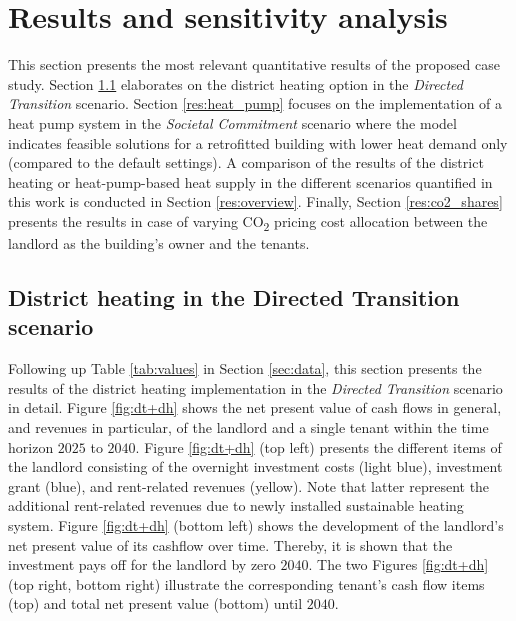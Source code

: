 \section{Results and sensitivity analysis}\label{results}
This section presents the most relevant quantitative results of the proposed case study. Section \ref{res:district_heating} elaborates on the district heating option in the \textit{Directed Transition} scenario. Section \ref{res:heat_pump} focuses on the implementation of a heat pump system in the \textit{Societal Commitment} scenario where the model indicates feasible solutions for a retrofitted building with lower heat demand only (compared to the default settings). A comparison of the results of the district heating or heat-pump-based heat supply in the different scenarios quantified in this work is conducted in Section \ref{res:overview}. Finally, Section \ref{res:co2_shares} presents the results in case of varying CO\textsubscript{2} pricing cost allocation between the landlord as the building's owner and the tenants. 

\subsection{District heating in the Directed Transition scenario}\label{res:district_heating}
Following up Table \ref{tab:values} in Section \ref{sec:data}, this section presents the results of the district heating implementation in the \textit{Directed Transition} scenario in detail. Figure \ref{fig:dt+dh} shows the net present value of cash flows in general, and revenues in particular, of the landlord and a single tenant within the time horizon $2025$ to $2040$. Figure \ref{fig:dt+dh} (top left) presents the different items of the landlord consisting of the overnight investment costs (light blue), investment grant (blue), and rent-related revenues (yellow). Note that latter represent the additional rent-related revenues due to newly installed sustainable heating system. Figure \ref{fig:dt+dh} (bottom left) shows the development of the landlord's net present value of its cashflow over time. Thereby, it is shown that the investment pays off for the landlord by zero $2040$. The two Figures \ref{fig:dt+dh} (top right, bottom right) illustrate the corresponding tenant's cash flow items (top) and total net present value (bottom) until $2040$. 

